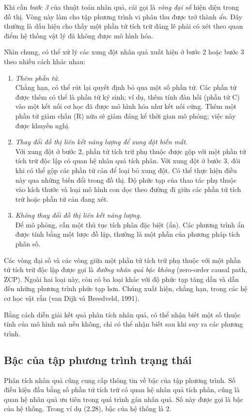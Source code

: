 Khi cần \emph{bước 3} của thuật toán nhân quả, cái gọi là \emph{vòng đại số} hiện diện trong đồ thị. Vòng này làm cho tập phương trình vi phân thu được trở thành \emph{ẩn}. Đây thường là dấu hiệu cho thấy một phần tử tích trữ đáng lẽ phải có xét theo quan điểm hệ thống vật lý đã không được mô hình hóa.

Nhìn chung, có thể xử lý các xung đột nhân quả xuất hiện ở bước 2 hoặc bước 3 theo nhiều cách khác nhau:
\begin{enumerate}
\item \emph{Thêm phần tử.}\\
Chẳng hạn, có thể rút lại quyết định bỏ qua một số phần tử. Các phần tử được thêm có thể là phần tử ký sinh; ví dụ, thêm tính đàn hồi (phần tử C) vào một kết nối cơ học đã được mô hình hóa như kết nối cứng. Thêm một phần tử giảm chấn (R) nữa sẽ giảm đáng kể thời gian mô phỏng; việc này được khuyến nghị.
\item \emph{Thay đổi đồ thị liên kết năng lượng để xung đột biến mất.}\\
Với xung đột ở bước 2, phần tử tích trữ phụ thuộc được gộp với một phần tử tích trữ độc lập có quan hệ nhân quả tích phân. Với xung đột ở bước 3, đôi khi có thể gộp các phần tử cản để loại bỏ xung đột. Có thể thực hiện điều này qua những biến đổi trong đồ thị. Độ phức tạp của thao tác phụ thuộc vào kích thước và loại mô hình con dọc theo đường đi giữa các phần tử tích trữ hoặc phần tử cản đang xét.
\item \emph{Không thay đổi đồ thị liên kết năng lượng.}\\
Để mô phỏng, cần một thủ tục tích phân đặc biệt (ẩn). Các phương trình ẩn được tính bằng một lược đồ lặp, thường là một phần của phương pháp tích phân số.
\end{enumerate}

Các vòng đại số và các vòng giữa một phần tử tích trữ phụ thuộc với một phần tử tích trữ độc lập được gọi là \emph{đường nhân quả bậc không} (zero-order causal path, ZCP). Ngoài hai loại này, còn có ba loại khác với độ phức tạp tăng dần và dẫn đến những phương trình phức tạp hơn. Chúng xuất hiện, chẳng hạn, trong các hệ cơ học vật rắn (van Dijk và Breedveld, 1991).

Bằng cách diễn giải kết quả phân tích nhân quả, có thể nhận biết một số thuộc tính của mô hình mà nếu không, chỉ có thể nhận biết sau khi suy ra các phương trình.

\subsection{Bậc của tập phương trình trạng thái}
Phân tích nhân quả cũng cung cấp thông tin về bậc của tập phương trình. Số điều kiện đầu bằng số phần tử tích trữ có quan hệ nhân quả tích phân, cũng là quan hệ nhân quả ưu tiên trong quá trình gán nhân quả. Số này được gọi là bậc của hệ thống. Trong ví dụ (2.28), bậc của hệ thống là 2.

